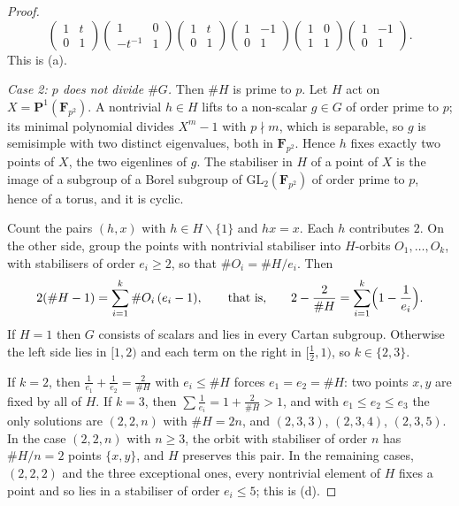 \documentclass[11pt]{amsart}
\theoremstyle{definition}
\newcommand{\F}{\mathbf{F}}
\newcommand{\GL}{\mathrm{GL}}
\begin{document}
\begin{proof}
\[\begin{pmatrix}1&t\\0&1\end{pmatrix}\begin{pmatrix}1&0\\-t^{-1}&1\end{pmatrix}\begin{pmatrix}1&t\\0&1\end{pmatrix}\begin{pmatrix}1&-1\\0&1\end{pmatrix}\begin{pmatrix}1&0\\1&1\end{pmatrix}\begin{pmatrix}1&-1\\0&1\end{pmatrix}.
\]
This is (a).

\emph{Case 2: $p$ does not divide $\#G$.} Then $\#H$ is prime to $p$. Let $H$ act on $X=\mathbf P^1(\F_{p^2})$. A nontrivial $h\in H$ lifts to a non-scalar $g\in G$ of order prime to $p$; its minimal polynomial divides $X^m-1$ with $p\nmid m$, which is separable, so $g$ is semisimple with two distinct eigenvalues, both in $\F_{p^2}$. Hence $h$ fixes exactly two points of $X$, the two eigenlines of $g$. The stabiliser in $H$ of a point of $X$ is the image of a subgroup of a Borel subgroup of $\GL_2(\F_{p^2})$ of order prime to $p$, hence of a torus, and it is cyclic.

Count the pairs $(h,x)$ with $h\in H\smallsetminus\{1\}$ and $hx=x$. Each $h$ contributes $2$. On the other side, group the points with nontrivial stabiliser into $H$-orbits $O_1,\dots,O_k$, with stabilisers of order $e_i\ge2$, so that $\#O_i=\#H/e_i$. Then
\[
2(\#H-1)=\sum_{i=1}^k\#O_i\,(e_i-1),\qquad\text{that is,}\qquad 2-\frac2{\#H}=\sum_{i=1}^k\Bigl(1-\frac1{e_i}\Bigr).
\]
If $H=1$ then $G$ consists of scalars and lies in every Cartan subgroup. Otherwise the left side lies in $[1,2)$ and each term on the right in $[\tfrac12,1)$, so $k\in\{2,3\}$.

If $k=2$, then $\tfrac1{e_1}+\tfrac1{e_2}=\tfrac2{\#H}$ with $e_i\le\#H$ forces $e_1=e_2=\#H$: two points $x,y$ are fixed by all of $H$. If $k=3$, then $\sum\tfrac1{e_i}=1+\tfrac2{\#H}>1$, and with $e_1\le e_2\le e_3$ the only solutions are $(2,2,n)$ with $\#H=2n$, and $(2,3,3)$, $(2,3,4)$, $(2,3,5)$. In the case $(2,2,n)$ with $n\ge3$, the orbit with stabiliser of order $n$ has $\#H/n=2$ points $\{x,y\}$, and $H$ preserves this pair. In the remaining cases, $(2,2,2)$ and the three exceptional ones, every nontrivial element of $H$ fixes a point and so lies in a stabiliser of order $e_i\le5$; this is (d).


\end{proof}
\end{document}

